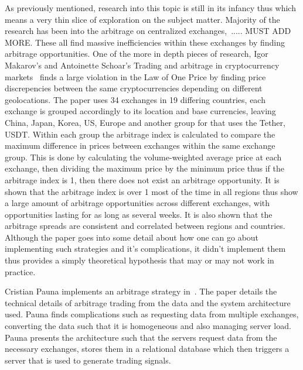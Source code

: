As previously mentioned, research into this topic is still in its infancy thus which means a very thin slice of exploration on the subject matter. Majority of the research has been into the arbitrage on centralized exchanges,~\cite{MakarovIgor2020Taai, crepelliere_arbitrage_2022, PAUNACristian2018ATSf}..... MUST ADD MORE. These all find massive inefficiencies within these exchanges by finding arbitrage opportunities. One of the more in depth pieces of research, Igor Makarov's and Antoinette Schoar's Trading and arbitrage in cryptocurrency markets~\cite{MakarovIgor2020Taai} finds a large violation in the Law of One Price by finding price discrepencies between the same cryptocurrencies depending on different geolocations. The paper uses 34 exchanges in 19 differing countries, each exchange is grouped accordingly to its location and base currencies, leaving China, Japan, Korea, US, Europe and another group for that uses the Tether, USDT. Within each group the arbitrage index is calculated to compare the maximum difference in prices between exchanges within the same exchange group. This is done by calculating the volume-weighted average price at each exchange, then dividing the maximum price by the minimum price thus if the arbitrage index is 1, then there does not exist an arbitrage opportunity. It is shown that the arbitrage index is over 1 most of the time in all regions thus show a large amount of arbitrage opportunities across different exchanges, with opportunities lasting for as long as several weeks. It is also shown that the arbitrage spreads are consistent and correlated between regions and countries. Although the paper goes into some detail about how one can go about implementing such strategies and it's complications, it didn't implement them thus provides a simply theoretical hypothesis that may or may not work in practice.


Cristian Pauna implements an arbitrage strategy in~\cite{PAUNACristian2018ATSf}. The paper details the technical details of arbitrage trading from the data and the system architecture used. Pauna finds complications such as requesting data from multiple exchanges, converting the data such that it is homogeneous and also managing server load. Pauna presents the architecture such that the servers request data from the necessary exchanges, stores them in a relational database which then triggers a server that is used to generate trading signals.

